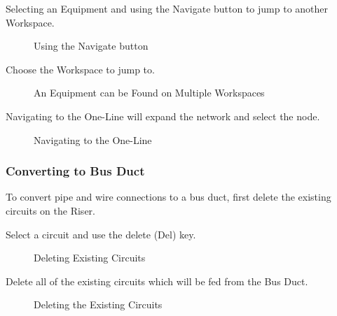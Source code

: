 \documentclass[letterpaper,10pt,english]{sphinxmanual}
\begin{document}
Selecting an Equipment and using the Navigate button to jump to another Workspace.

\begin{figure}[H]
\centering
\capstart

\noindent{}
\caption{Using the Navigate button}\label{\detokenize{docs/userguide/buildingelectricalmodel/riser/index-riser:id26}}\end{figure}

Choose the Workspace to jump to.

\begin{figure}[H]
\centering
\capstart

\noindent{}
\caption{An Equipment can be Found on Multiple Workspaces}\label{\detokenize{docs/userguide/buildingelectricalmodel/riser/index-riser:id27}}\end{figure}

Navigating to the One-Line will expand the network and select the node.

\begin{figure}[H]
\centering
\capstart

\noindent{}
\caption{Navigating to the One-Line}\label{\detokenize{docs/userguide/buildingelectricalmodel/riser/index-riser:id28}}\end{figure}


\subsubsection{Converting to Bus Duct}
\label{\detokenize{docs/userguide/buildingelectricalmodel/riser/index-riser:converting-to-bus-duct}}
To convert pipe and wire connections to a bus duct, first delete the existing circuits on the Riser.

Select a circuit and use the delete (Del) key.

\begin{figure}[H]
\centering
\capstart

\noindent{}
\caption{Deleting Existing Circuits}\label{\detokenize{docs/userguide/buildingelectricalmodel/riser/index-riser:id29}}\end{figure}

Delete all of the existing circuits which will be fed from the Bus Duct.

\begin{figure}[H]
\centering
\capstart

\noindent{}
\caption{Deleting the Existing Circuits}\label{\detokenize{docs/userguide/buildingelectricalmodel/riser/index-riser:id30}}\end{figure}
\end{document}
